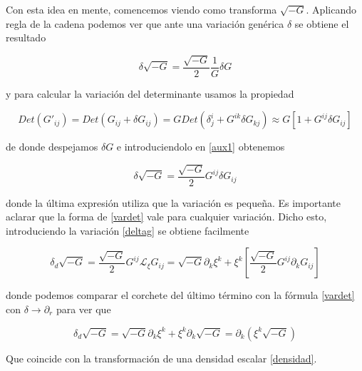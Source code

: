 \documentclass{article}
\numberwithin{equation}{section}
\begin{document}
Con esta idea en mente, comencemos viendo como transforma $ \sqrt{-G} $. Aplicando regla de la cadena podemos ver que ante una variación genérica $ \delta $ se obtiene el resultado

\begin{equation}\label{aux1}
\delta \sqrt{-G} = \frac{\sqrt{-G}}{2} \frac{1}{G} \delta G
\end{equation}

y para calcular la variación del determinante usamos la propiedad

\begin{equation*}
Det(G'_{i j})= Det(G_{i j} + \delta G_{i j}) = G Det\left( \delta^i_j + G^{i k} \delta G_{k j }\right) \approx G \left[ 1 + G^{i j} \delta G_{i j}\right]
\end{equation*}

de donde despejamos $ \delta G $ e introduciendolo en \ref{aux1} obtenemos

\begin{equation}\label{vardet}
\delta \sqrt{-G} = \frac{\sqrt{-G}}{2} G^{i j} \delta G_{i j}
\end{equation}

donde la última expresión utiliza que la variación es pequeña. Es importante aclarar que la forma de \ref{vardet} vale para cualquier variación. Dicho esto, introduciendo la variación \ref{deltag} se obtiene facilmente

\begin{equation*}
\delta_d \sqrt{-G} = \frac{\sqrt{-G}}{2} G^{i j} \mathcal{L}_{\xi} G_{i j} =  \sqrt{-G} \partial_k \xi^k + \xi^k \left[\frac{\sqrt{-G}}{2} G^{i j} \partial_k G_{i j}\right]
\end{equation*} 

donde podemos comparar el corchete del último término con la fórmula \ref{vardet} con $ \delta \rightarrow \partial_{r} $ para ver que

\vspace{0.4cm}

\begin{boxquation}
\begin{equation}\label{res1}
\delta_d \sqrt{-G} = \sqrt{-G} \partial_k \xi^k + \xi^k \partial_k \sqrt{-G} = \partial_k \left(\xi^k \sqrt{-G}\right)
\end{equation}
\end{boxquation}

Que coincide con la transformación de una densidad escalar \ref{densidad}.\\
\end{document}

